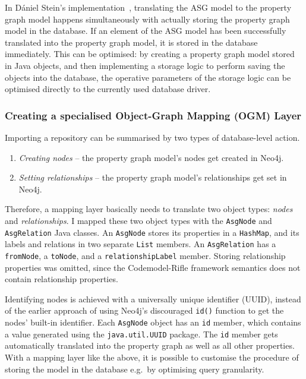 In Dániel Stein's implementation~\cite{stein-daniel-msc}, translating the ASG model to the property graph model happens simultaneously with actually storing the property graph model in the database. If an element of the ASG model has been successfully translated into the property graph model, it is stored in the database immediately. This can be optimised: by creating a property graph model stored in Java objects, and then implementing a storage logic to perform saving the objects into the database, the operative parameters of the storage logic can be optimised directly to the currently used database driver.

\subsubsection{Creating a specialised Object-Graph Mapping (OGM) Layer}

Importing a repository can be summarised by two types of database-level action.

\begin{enumerate}
\item \emph{Creating nodes} – the property graph model's nodes get created in Neo4j.
\item \emph{Setting relationships} – the property graph model's relationships get set in Neo4j.
\end{enumerate}

Therefore, a mapping layer basically needs to translate two object types: \emph{nodes} and \emph{relationships}. I mapped these two object types with the \texttt{AsgNode} and \texttt{AsgRelation} Java classes. An \texttt{AsgNode} stores its properties in a \texttt{HashMap}, and its labels and relations in two separate \texttt{List} members. An \texttt{AsgRelation} has a \texttt{fromNode}, a \texttt{toNode}, and a \texttt{relationshipLabel} member. Storing relationship properties was omitted, since the Codemodel-Rifle framework semantics does not contain relationship properties.

Identifying nodes is achieved with a universally unique identifier (UUID), instead of the earlier approach of using Neo4j's discouraged \texttt{id()} function to get the nodes' built-in identifier. Each \texttt{AsgNode} object has an \texttt{id} member, which contains a value generated using the \texttt{java.util.UUID} package. The \texttt{id} member gets automatically translated into the property graph as well as all other properties. With a mapping layer like the above, it is possible to customise the procedure of storing the model in the database e.g.\ by optimising query granularity.


